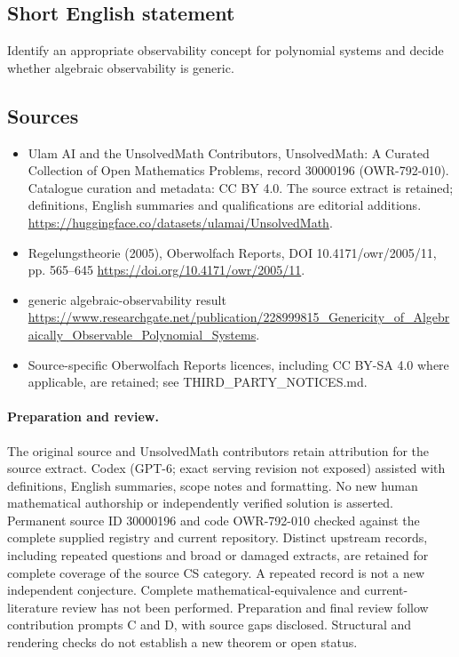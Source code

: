 \documentclass[11pt]{article}
\begin{document}
\subsection{Short English statement}
Identify an appropriate observability concept for polynomial systems and decide whether algebraic observability is generic.
\subsection{Sources}
\begin{itemize}
\item[\hypertarget{source:30000196:1}{S1}] Ulam AI and the UnsolvedMath Contributors, UnsolvedMath: A Curated Collection of Open Mathematics Problems, record 30000196 (OWR-792-010). Catalogue curation and metadata: CC BY 4.0. The source extract is retained; definitions, English summaries and qualifications are editorial additions.
\url{https://huggingface.co/datasets/ulamai/UnsolvedMath}.
\item[\hypertarget{source:30000196:2}{S2}] Regelungstheorie (2005), Oberwolfach Reports, DOI 10.4171/owr/2005/11, pp. 565--645
\url{https://doi.org/10.4171/owr/2005/11}.
\item[\hypertarget{source:30000196:3}{S3}] generic algebraic-observability result
\url{https://www.researchgate.net/publication/228999815_Genericity_of_Algebraically_Observable_Polynomial_Systems}.
\item Source-specific Oberwolfach Reports licences, including CC BY-SA 4.0 where applicable, are retained; see THIRD\_PARTY\_NOTICES.md.
\end{itemize}
\paragraph{Preparation and review.}
The original source and UnsolvedMath contributors retain attribution for the source extract. Codex (GPT-6; exact serving revision not exposed) assisted with definitions, English summaries, scope notes and formatting. No new human mathematical authorship or independently verified solution is asserted. Permanent source ID 30000196 and code OWR-792-010 checked against the complete supplied registry and current repository. Distinct upstream records, including repeated questions and broad or damaged extracts, are retained for complete coverage of the source CS category. A repeated record is not a new independent conjecture. Complete mathematical-equivalence and current-literature review has not been performed. Preparation and final review follow contribution prompts C and D, with source gaps disclosed. Structural and rendering checks do not establish a new theorem or open status.
\label{end:30000196}
\end{document}
